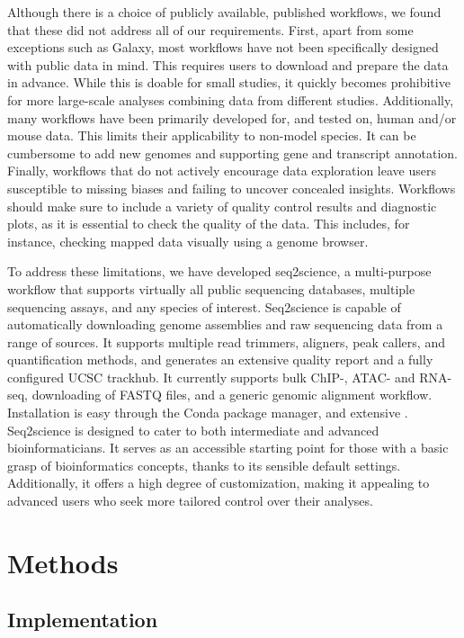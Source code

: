Although there is a choice of publicly available, published workflows, we found that these did not address all of our requirements. First, apart from some exceptions such as Galaxy, most workflows have not been specifically designed with public data in mind. This requires users to download and prepare the data in advance. While this is doable for small studies, it quickly becomes prohibitive for more large-scale analyses combining data from different studies. Additionally, many workflows have been primarily developed for, and tested on, human and/or mouse data. This limits their applicability to non-model species. It can be cumbersome to add new genomes and supporting gene and transcript annotation. Finally, workflows that do not actively encourage data exploration leave users susceptible to missing biases and failing to uncover concealed insights. Workflows should make sure to include a variety of quality control results and diagnostic plots, as it is essential to check the quality of the data. This includes, for instance, checking mapped data visually using a genome browser. 

To address these limitations, we have developed seq2science, a multi-purpose workflow that supports virtually all public sequencing databases, multiple sequencing assays, and any species of interest. Seq2science is capable of automatically downloading genome assemblies and raw sequencing data from a range of sources. It supports multiple read trimmers, aligners, peak callers, and quantification methods, and generates an extensive quality report and a fully configured UCSC trackhub. It currently supports bulk ChIP-, ATAC- and RNA-seq, downloading of FASTQ files, and a generic genomic alignment workflow. Installation is easy through the Conda package manager, and extensive \href{https://vanheeringen-lab.github.io/seq2science/}{\color{blue}{documentation is available online}}. Seq2science is designed to cater to both intermediate and advanced bioinformaticians. It serves as an accessible starting point for those with a basic grasp of bioinformatics concepts, thanks to its sensible default settings. Additionally, it offers a high degree of customization, making it appealing to advanced users who seek more tailored control over their analyses.

\section{Methods}

\subsection{Implementation}

